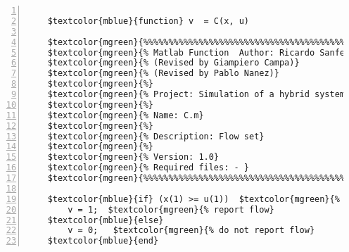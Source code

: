 %  
%  
%  
%  
  
  
\DefineShortVerb[fontfamily=courier,fontseries=m]{\$} 
\DefineShortVerb[fontfamily=courier,fontseries=b]{\#} 
  
\begin{Verbatim}[commandchars=\$\{\},numbers=left,numbersep=2pt] 

    $textcolor{mblue}{function} v  = C(x, u)  
     
    $textcolor{mgreen}{%%%%%%%%%%%%%%%%%%%%%%%%%%%%%%%%%%%%%%%%%%%%%%%%%%%%%%%%%%%%%%%%%%%%%%%%%%%} 
    $textcolor{mgreen}{% Matlab Function  Author: Ricardo Sanfelice } 
    $textcolor{mgreen}{% (Revised by Giampiero Campa)} 
    $textcolor{mgreen}{% (Revised by Pablo Nanez)} 
    $textcolor{mgreen}{%} 
    $textcolor{mgreen}{% Project: Simulation of a hybrid system (Bouncing ball)} 
    $textcolor{mgreen}{%} 
    $textcolor{mgreen}{% Name: C.m} 
    $textcolor{mgreen}{%} 
    $textcolor{mgreen}{% Description: Flow set} 
    $textcolor{mgreen}{%} 
    $textcolor{mgreen}{% Version: 1.0} 
    $textcolor{mgreen}{% Required files: - } 
    $textcolor{mgreen}{%%%%%%%%%%%%%%%%%%%%%%%%%%%%%%%%%%%%%%%%%%%%%%%%%%%%%%%%%%%%%%%%%%%%%%%%%%%} 
     
    $textcolor{mblue}{if} (x(1) >= u(1))  $textcolor{mgreen}{% flow condition} 
        v = 1;  $textcolor{mgreen}{% report flow} 
    $textcolor{mblue}{else} 
        v = 0;   $textcolor{mgreen}{% do not report flow} 
    $textcolor{mblue}{end}  
\end{Verbatim}  
  
\UndefineShortVerb{\$} 
\UndefineShortVerb{\#} 
 